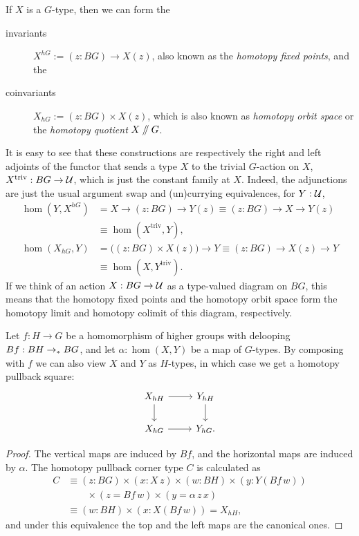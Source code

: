 If $X$ is a $G$-type, then we can form the
\begin{description}
\item[invariants] $X^{hG} := (z : BG) \to X(z)$, also known as the
  \emph{homotopy fixed points}, and the
\item[coinvariants] $X_{hG} := (z : BG) \times X(z)$, which is also known as
  \emph{homotopy orbit space} or the \emph{homotopy quotient}
  $X \mathbin{/\kern-3pt/} G$.
\end{description}
It is easy to see that these constructions are respectively the right and left
adjoints of the functor that sends a type $X$ to the trivial
$G$-action on $X$, $X^{\mathrm{triv}} : BG \to \mathcal{U}$, which is just
the constant family at $X$. Indeed, the adjunctions are just the usual argument
swap and (un)currying equivalences, for $Y:\mathcal{U}$,
\begin{align*}
  \hom(Y, X^{hG})
  &= X \to (z : BG) \to Y(z)
    \equiv (z : BG) \to X \to Y(z) \\
  &\equiv \hom(X^{\mathrm{triv}}, Y), \\
  \hom(X_{hG}, Y)
  &= \big((z : BG) \times X(z)\bigr) \to Y
    \equiv (z : BG) \to X(z) \to Y \\
  &\equiv \hom(X, Y^{\mathrm{triv}}).
\end{align*}
If we think of an action $X : BG\to \mathcal{U}$
as a type-valued diagram on $BG$, this means that the homotopy fixed
points and the homotopy orbit space form the homotopy limit and
homotopy colimit of this diagram, respectively.

\begin{prp}
  \label{prop:action-hom-pullback}
  Let $f : H \to G$ be a homomorphism of higher groups with delooping
  $Bf : BH \to_\ast BG$, and let $\alpha : \hom(X,Y)$ be a map of
  $G$-types. By composing with $f$ we can also view $X$ and $Y$ as
  $H$-types, in which case we get a homotopy pullback square:
  \[
    \begin{tikzcd}
      X_{hH} \ar[r]\ar[d] & Y_{hH}\ar[d] \\
      X_{hG} \ar[r]       & Y_{hG}.
    \end{tikzcd}
  \]
\end{prp}
\begin{proof}
  The vertical maps are induced by $Bf$, and the horizontal maps are
  induced by $\alpha$. The homotopy pullback corner type $C$ is calculated as
  \begin{align*}
    C
    &\equiv (z : BG) \times (x : X\,z)
      \times (w : BH) \times (y : Y(Bf\,w)) \\
    &\qquad \times (z = Bf\,w) \times (y = \alpha\,z\,x) \\
    &\equiv (w : BH) \times (x : X(Bf\,w))
      = X_{hH},
  \end{align*}
  and under this equivalence the top and the left maps are the
  canonical ones.
\end{proof}

